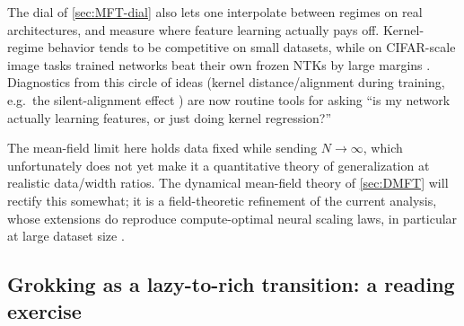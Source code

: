 \documentclass[11pt]{article}
\begin{document}
The dial of \cref{sec:MFT-dial} %
also lets one interpolate between regimes on real architectures, and measure where feature learning actually pays off. Kernel-regime behavior tends to be competitive on small datasets, while on CIFAR-scale image tasks trained networks beat their own frozen NTKs by large margins \cite{geiger2020disentangling}. Diagnostics from this circle of ideas (kernel distance/alignment during training, e.g.\ the silent-alignment effect \cite{atanasov2022silent}) are now routine tools for asking ``is my network actually learning features, or just doing kernel regression?''

The mean-field limit here holds data fixed while sending $N\to\infty$, which unfortunately does not yet make it a quantitative theory of generalization at realistic data/width ratios. The dynamical mean-field theory of \cref{sec:DMFT} \cite{bordelon2022self} will rectify this somewhat; it is a field-theoretic refinement of the current analysis, whose extensions do reproduce compute-optimal neural scaling laws, in particular at large dataset size \cite{bordelon2024dynamical}.



\subsection{Grokking as a lazy-to-rich transition: a reading exercise}
\label{sec:grok-lazy}
\end{document}
